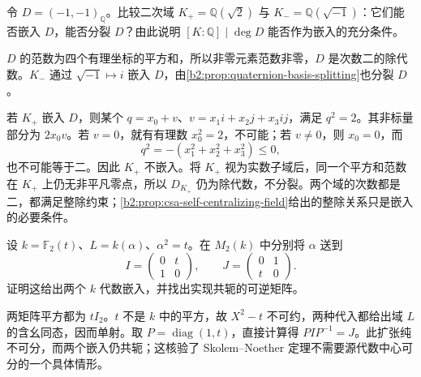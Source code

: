 \begin{exercise}\label{b2:ex:17-subfield-degree-divides}
	令 \(D=(-1,-1)_{\mathbb Q}\)。比较二次域 \(K_+=\mathbb Q(\sqrt2)\) 与 \(K_-=\mathbb Q(\sqrt{-1})\)：它们能否嵌入 \(D\)，能否分裂 \(D\)？由此说明 \([K:\mathbb Q]\mid\deg D\) 能否作为嵌入的充分条件。
\end{exercise}
\begin{solution}
	\(D\) 的范数为四个有理坐标的平方和，所以非零元素范数非零，\(D\) 是次数二的除代数。\(K_-\) 通过 \(\sqrt{-1}\mapsto i\) 嵌入 \(D\)，由\cref{b2:prop:quaternion-basis-splitting}也分裂 \(D\)。

	若 \(K_+\) 嵌入 \(D\)，则某个 \(q=x_0+v\)、\(v=x_1i+x_2j+x_3ij\)，满足 \(q^2=2\)。其非标量部分为 \(2x_0v\)。若 \(v=0\)，就有有理数 \(x_0^2=2\)，不可能；若 \(v\ne0\)，则 \(x_0=0\)，而
	\[
		q^2=-(x_1^2+x_2^2+x_3^2)\le0,
	\]
	也不可能等于二。因此 \(K_+\) 不嵌入。将 \(K_+\) 视为实数子域后，同一个平方和范数在 \(K_+\) 上仍无非平凡零点，所以 \(D_{K_+}\) 仍为除代数，不分裂。两个域的次数都是二，都满足整除约束；\cref{b2:prop:csa-self-centralizing-field}给出的整除关系只是嵌入的必要条件。
\end{solution}

\begin{exercise}\label{b2:ex:17-inseparable-skolem}
	设 \(k=\mathbb F_2(t)\)、\(L=k(\alpha)\)、\(\alpha^2=t\)。在 \(M_2(k)\) 中分别将 \(\alpha\) 送到
	\[
		I=\begin{pmatrix}0&t\\1&0\end{pmatrix},\qquad
		J=\begin{pmatrix}0&1\\t&0\end{pmatrix}.
	\]
	证明这给出两个 \(k\) 代数嵌入，并找出实现共轭的可逆矩阵。
\end{exercise}
\begin{solution}
	两矩阵平方都为 \(tI_2\)。\(t\) 不是 \(k\) 中的平方，故 \(X^2-t\) 不可约，两种代入都给出域 \(L\) 的含幺同态，因而单射。取 \(P=\operatorname{diag}(1,t)\)，直接计算得 \(PIP^{-1}=J\)。此扩张纯不可分，而两个嵌入仍共轭；这核验了 Skolem–Noether 定理不需要源代数中心可分的一个具体情形。
\end{solution}

